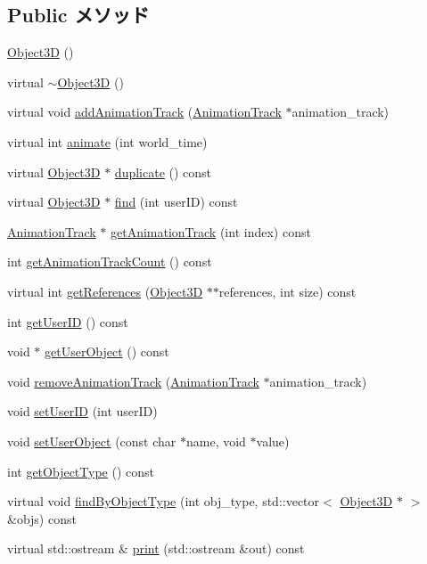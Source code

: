 \subsection*{Public メソッド}
\begin{CompactItemize}
\item 
\hyperlink{classm3g_1_1Object3D_f4b10c33b9014a3f0a675ef4b699b773}{Object3D} ()
\item 
virtual \hyperlink{classm3g_1_1Object3D_8ece10725587e63a2c75283c16cc4df5}{$\sim$Object3D} ()
\item 
virtual void \hyperlink{classm3g_1_1Object3D_415c0b110f95410ded9b85e5d99a496b}{addAnimationTrack} (\hyperlink{classm3g_1_1AnimationTrack}{AnimationTrack} $\ast$animation\_\-track)
\item 
virtual int \hyperlink{classm3g_1_1Object3D_8aad1ceab4c2a03609c8a42324ce484d}{animate} (int world\_\-time)
\item 
virtual \hyperlink{classm3g_1_1Object3D}{Object3D} $\ast$ \hyperlink{classm3g_1_1Object3D_a25110dac934f867b83b73ad4741a0f4}{duplicate} () const 
\item 
virtual \hyperlink{classm3g_1_1Object3D}{Object3D} $\ast$ \hyperlink{classm3g_1_1Object3D_aa62f6aaac2e9359875f027ca05788ac}{find} (int userID) const 
\item 
\hyperlink{classm3g_1_1AnimationTrack}{AnimationTrack} $\ast$ \hyperlink{classm3g_1_1Object3D_f0978f3f2efe3227ca613da3361424dd}{getAnimationTrack} (int index) const 
\item 
int \hyperlink{classm3g_1_1Object3D_0926843b66090795972850376b8e4e6c}{getAnimationTrackCount} () const 
\item 
virtual int \hyperlink{classm3g_1_1Object3D_ddf91fbaaa866aa7aad5d530a69feba8}{getReferences} (\hyperlink{classm3g_1_1Object3D}{Object3D} $\ast$$\ast$references, int size) const 
\item 
int \hyperlink{classm3g_1_1Object3D_b8d9067364251d0208fcdc502d394e2c}{getUserID} () const 
\item 
void $\ast$ \hyperlink{classm3g_1_1Object3D_a9b8541216c1fa7792617218a5fb6672}{getUserObject} () const 
\item 
void \hyperlink{classm3g_1_1Object3D_e36d8f8544daee6bd4e2ccd6755ed03d}{removeAnimationTrack} (\hyperlink{classm3g_1_1AnimationTrack}{AnimationTrack} $\ast$animation\_\-track)
\item 
void \hyperlink{classm3g_1_1Object3D_5e4753e91dca5aa56abacb7fde69f332}{setUserID} (int userID)
\item 
void \hyperlink{classm3g_1_1Object3D_989411d827091f4a5e97e0377bbd1a7a}{setUserObject} (const char $\ast$name, void $\ast$value)
\item 
int \hyperlink{classm3g_1_1Object3D_06be1b37b707b5f227cba2308043f3df}{getObjectType} () const 
\item 
virtual void \hyperlink{classm3g_1_1Object3D_4dadb21b568b0230fac106f15040138c}{findByObjectType} (int obj\_\-type, std::vector$<$ \hyperlink{classm3g_1_1Object3D}{Object3D} $\ast$ $>$ \&objs) const 
\item 
virtual std::ostream \& \hyperlink{classm3g_1_1Object3D_6fea17fa1532df3794f8cb39cb4f911f}{print} (std::ostream \&out) const 
\end{CompactItemize}
